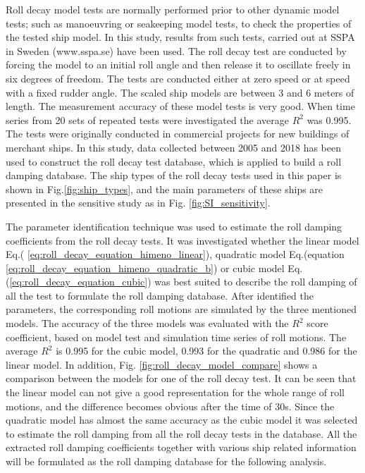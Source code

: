 Roll decay model tests are normally performed prior to other dynamic model tests; such as manoeuvring or seakeeping model tests, to check the properties of the tested ship model. In this study, results from such tests, carried out at SSPA in Sweden (www.sspa.se) have been used. The roll decay test are conducted by forcing the model to an initial roll angle and then release it to oscillate freely in six degrees of freedom. The tests are conducted either  at zero speed or at speed with a fixed rudder angle. The scaled ship models are between 3 and 6 meters of length. The measurement accuracy of these model tests is very good. When time series from 20 sets of repeated tests were investigated the average $R^2$ was 0.995. The tests were originally conducted in commercial projects for new buildings of merchant ships. In this study, data collected between 2005 and 2018 has been used to construct the roll decay test database, which is applied to build a roll damping database. The ship types of the roll decay tests used in this paper is shown in Fig.\ref{fig:ship_types}, and the main parameters of these ships are presented in the sensitive study as in Fig. \ref{fig:SI_sensitivity}. 


The parameter identification technique was used to estimate the roll damping coefficients from the roll decay tests. It was investigated whether the linear model Eq.( \ref{eq:roll_decay_equation_himeno_linear}), quadratic model Eq.(equation \ref{eq:roll_decay_equation_himeno_quadratic_b}) or cubic model Eq.(\ref{eq:roll_decay_equation_cubic}) was best suited to describe the roll damping of all the test to formulate the roll damping database. After identified the parameters, the corresponding roll motions are simulated by the three mentioned models. The accuracy of the three models was evaluated with the $R^2$ score coefficient, based on model test and simulation time series of roll motions.
The average $R^2$ is 0.995 for the cubic model, 0.993 for the quadratic and 0.986 for the linear model. In addition, Fig. \ref{fig:roll_decay_model_compare} shows a comparison between the models for one of the roll decay test. It can be seen that the linear model can not give a good representation for the whole range of roll motions, and the difference becomes obvious after the time of 30s. Since the quadratic model has almost the same accuracy as the cubic model it was selected to estimate the roll damping from all the roll decay tests in the database. All the extracted roll damping coefficients together with various ship related information will be formulated as the roll damping database for the following analysis.

